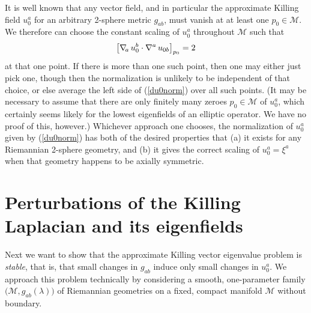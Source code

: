 \documentclass[12pt,letterpaper]{iopart}
\newcommand\M{\mathcal{M}}
\begin{document}
It is well known that any vector field, and in particular the approximate Killing field $u_0^a$ for an arbitrary 2-sphere metric $g_{ab}$, must vanish at at least one $p_0 \in \M$.  We therefore can choose the constant scaling of $u_0^a$ throughout $\M$ such that 
%
\begin{equation}\label{du0norm}
	\bigl[ \nabla\!_a\, u_0^b \cdot \nabla^a\, u_{0b} \bigr]_{p_0} = 2 
\end{equation}
%
at that one point.  If there is more than one such point, then one may either just pick one, though then the normalization is unlikely to be independent of that choice, or else average the left side of (\ref{du0norm}) over all such points.  (It may be necessary to assume that there are only finitely many zeroes $p_0 \in \M$ of $u_0^a$, which certainly seems likely for the lowest eigenfields of an elliptic operator.  We have no proof of this, however.)  Whichever approach one chooses, the normalization of $u_0^a$ given by (\ref{du0norm}) has both of the desired properties that (a) it exists for any Riemannian 2-sphere geometry, and (b) it gives the correct scaling of $u_0^a = \xi^a$ when that geometry happens to be axially symmetric. 


\section{Perturbations of the Killing Laplacian and its eigenfields}

Next we want to show that the approximate Killing vector eigenvalue problem is \textit{stable}, that is, that small changes in $g_{ab}$ induce only small changes in $u_0^a$.  We approach this problem technically by considering a smooth, one-parameter family $\bigl( \M, g_{ab}(\lambda) \bigr)$ of Riemannian geometries on a fixed, compact manifold $\M$ without boundary.
\end{document}
